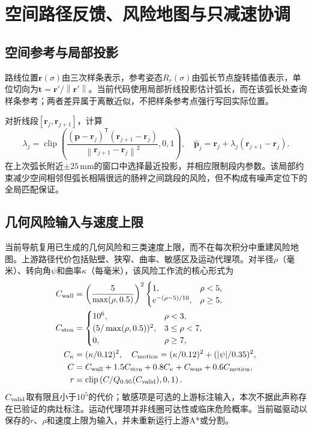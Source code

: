 \documentclass[UTF8,a4paper,zihao=5,fontset=windows]{ctexart}
\newcommand{\vect}[1]{\bm{#1}}
\newcommand{\norm}[1]{\left\lVert#1\right\rVert}
\newcommand{\clip}{\operatorname{clip}}
\newcommand{\unit}[1]{\,\mathrm{#1}}
\begin{document}
\section{空间路径反馈、风险地图与只减速协调}
\subsection{空间参考与局部投影}
路线位置$\vect r(\sigma)$由三次样条表示，参考姿态$R_r(\sigma)$由弧长节点旋转插值表示，单位切向为$\vect t=\vect r'/\norm{\vect r'}$。当前代码使用局部折线投影估计弧长，而在该弧长处查询样条参考；两者差异属于离散近似，不把样条参考点强行写回实际位置。

对折线段$[\vect r_j,\vect r_{j+1}]$，计算
\begin{equation}
\lambda_j=\clip\!\left(\frac{(\vect p-\vect r_j)^{\mathsf T}(\vect r_{j+1}-\vect r_j)}{\norm{\vect r_{j+1}-\vect r_j}^2},0,1\right),\quad
\hat{\vect p}_j=\vect r_j+\lambda_j(\vect r_{j+1}-\vect r_j).
\label{eq:projection}
\end{equation}
在上次弧长附近$\pm25\unit{mm}$的窗口中选择最近投影，并相应限制段内参数。该局部约束减少空间相邻但弧长相隔很远的肠袢之间跳段的风险，但不构成有噪声定位下的全局匹配保证。

\subsection{几何风险输入与速度上限}
当前导航复用已生成的几何风险和三类速度上限，而不在每次积分中重建风险地图。上游路径代价包括贴壁、狭窄、曲率、敏感区及运动代理项。对半径$\rho$（毫米）、转向角$\psi$和曲率$\kappa$（每毫米），该风险工作流的核心形式为
\begin{align}
C_{\rm wall}&=\left(\frac{5}{\max(\rho,0.5)}\right)^2
\begin{cases}1,&\rho<5,\\ e^{-(\rho-5)/10},&\rho\ge5,\end{cases}\\
C_{\rm sten}&=\begin{cases}10^6,&\rho<3,\\(5/\max(\rho,0.5))^2,&3\le\rho<7,\\0,&\rho\ge7,\end{cases}\\
C_\kappa&=(\kappa/0.12)^2,\quad C_{\rm motion}=(\kappa/0.12)^2+(|\psi|/0.35)^2,\\
C&=C_{\rm wall}+1.5C_{\rm sten}+0.8C_\kappa+C_{\rm sens}+0.6C_{\rm motion},\\
r&=\clip\left(C/Q_{0.95}(C_{\rm valid}),0,1\right).
\label{eq:risk}
\end{align}
$C_{\rm valid}$取有限且小于$10^5$的代价；敏感项是可选的上游标注输入，本次不据此声称存在已验证的病灶标注。运动代理项并非线圈可达性或临床危险概率。当前磁驱动以保存的$r$、$\rho$和速度上限为输入，并未重新运行上游A*或分割。
\end{document}
